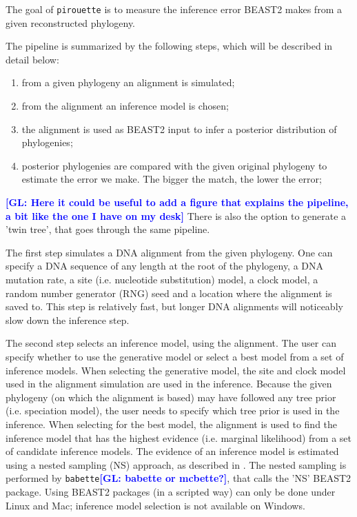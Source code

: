 \documentclass{article}
\newcommand{\giovanni}[1]{\textcolor{blue}{\textbf{[GL: #1]}}}
\begin{document}
The goal of \verb;pirouette; is to measure the inference error BEAST2
makes from a given reconstructed phylogeny.

The pipeline is summarized by the following steps, which will be described in detail below:
\begin{enumerate}
    \item from a given phylogeny an alignment is simulated;
    \item from the alignment an inference model is chosen;
    \item the alignment is used as BEAST2 input to infer a posterior distribution of phylogenies;
    \item posterior phylogenies are compared with the given original phylogeny to estimate the error we make. The bigger the match, the lower the error;
\end{enumerate}
\giovanni{Here it could be useful to add a figure that explains the pipeline, a bit like the one I have on my desk}
There is also the option to generate a 'twin tree',
that goes through the same pipeline.

The first step simulates a DNA alignment from the given phylogeny.
One can specify a DNA sequence
of any length at the root of the phylogeny, a DNA mutation rate, a
site (i.e. nucleotide substitution) model, 
a clock model, a random number generator (RNG) seed and a location
where the alignment is saved to. This step is relatively fast, but longer
DNA alignments will noticeably slow down the inference step.

The second step selects an inference model, using the alignment.
The user can specify whether to use the generative model or select a best model
from a set of inference models. 
When selecting the generative model,
the site and clock model used in the alignment simulation are used
in the inference. Because the given phylogeny (on which the alignment is based)
may have followed any tree prior (i.e. speciation model), the user needs
to specify which tree prior is used in the inference. 
When selecting for the best
model, the alignment is used to find the inference model that has the
highest evidence (i.e. marginal likelihood) from a set of candidate inference models.
The evidence of an inference model is estimated using a nested sampling (NS)
approach, as described in \cite{maturana2018model}. The nested sampling is
performed by \verb;babette;\giovanni{babette or mcbette?}, that calls the 'NS' BEAST2 package. 
Using BEAST2 packages (in a scripted way) can only be done under Linux and Mac; 
inference model selection is not available on Windows.
\end{document}
